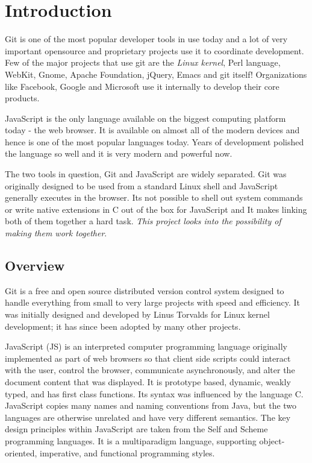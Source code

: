 \chapter{Introduction}

Git\cite{git} is one of the most popular developer tools in use today and a lot
of very important opensource and proprietary projects use it to coordinate
development. Few of the major projects that use git are the \textit{Linux
  kernel}, Perl language, WebKit, Gnome, Apache Foundation, jQuery, Emacs and
git itself! Organizations like Facebook, Google and Microsoft use it internally
to develop their core products.

JavaScript\cite{javascript} is the only language available on the biggest
computing platform today - the web browser. It is available on almost all of the
modern devices and hence is one of the most popular languages today. Years of
development polished the language so well and it is very modern and powerful
now.

The two tools in question, Git and JavaScript are widely separated. Git was
originally designed to be used from a standard Linux shell and JavaScript
generally executes in the browser. Its not possible to shell out system commands
or write native extensions in C out of the box for JavaScript and It makes
linking both of them together a hard task. \textit{This project looks into the
  possibility of making them work together}.

\section{Overview}

Git is a free and open source distributed version control system designed to
handle everything from small to very large projects with speed and efficiency.
It was initially designed and developed by Linus Torvalds for Linux kernel
development; it has since been adopted by many other projects.

JavaScript (JS) is an interpreted computer programming language originally
implemented as part of web browsers so that client side scripts could interact
with the user, control the browser, communicate asynchronously, and alter the
document content that was displayed. It is prototype based, dynamic, weakly
typed, and has first class functions. Its syntax was influenced by the language
C. JavaScript copies many names and naming conventions from Java, but the two
languages are otherwise unrelated and have very different semantics. The key
design principles within JavaScript are taken from the Self and Scheme
programming languages. It is a multiparadigm language, supporting
object-oriented, imperative, and functional programming styles.

